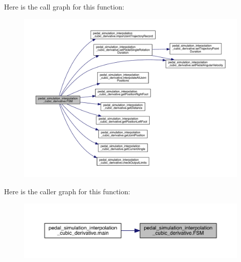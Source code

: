 \begin{DoxyCode}{0}

\end{DoxyCode}
Here is the call graph for this function\+:\nopagebreak
\begin{figure}[H]
\begin{center}
\leavevmode
\includegraphics[width=350pt]{namespacepedal__simulation__interpolation__cubic__derivative_a27598c0b1a95f3043035dc3740c4a421_cgraph}
\end{center}
\end{figure}
Here is the caller graph for this function\+:\nopagebreak
\begin{figure}[H]
\begin{center}
\leavevmode
\includegraphics[width=350pt]{namespacepedal__simulation__interpolation__cubic__derivative_a27598c0b1a95f3043035dc3740c4a421_icgraph}
\end{center}
\end{figure}
